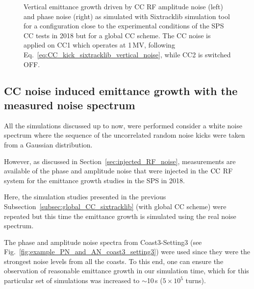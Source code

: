 \begin{figure}[htp]
\begin{subfigure}{.45\textwidth}
    \end{subfigure}
    \caption{Vertical emittance growth driven by CC RF amplitude noise (left) and phase noise (right) as simulated with Sixtracklib simulation tool for a configuration close to the experimental conditions of the SPS CC tests in 2018 but for a global CC scheme. The CC noise is applied on CC1 which operates at 1\,MV, following Eq.~\eqref{eq:CC_kick_sixtracklib_vertical_noise}, while CC2 is switched OFF.}
    \label{fig:study_3_sixtracklib_global_cc_scheme}
\end{figure}

\subsection{CC noise induced emittance growth with the measured noise spectrum}\label{subsec:global_CC_sixtracklib_noiseCoast3_setting3}
All the simulations discussed up to now, were performed consider a white noise spectrum where the sequence of the uncorrelated random noise kicks were taken from a Gaussian distribution. 

However, as discussed in Section~\ref{sec:injected_RF_noise}, measurements are available of the phase and amplitude noise that were injected in the ${\mathrm{CC}}$ RF system for the emittance growth studies in the SPS in 2018. 

Here, the simulation studies presented in the previous Subsection~\ref{subsec:global_CC_sixtracklib} (with global CC scheme) were repeated but this time the emittance growth is simulated using the real noise spectrum. 

The phase and amplitude noise spectra from Coast3-Setting3 (see Fig.~\ref{fig:example_PN_and_AN_coast3_setting3}) were used since they were the strongest noise levels from all the coasts. To this end, one can ensure the observation of reasonable emittance growth in our simulation time, which for this particular set of simulations was increased to $\sim$10\,s ($5\times 10^{5}$ turns).


